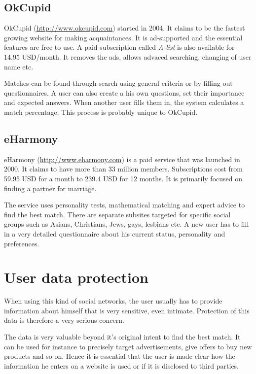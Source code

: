 \documentclass[12pt,oneside]{fithesis}
\begin{document}
		\subsection{OkCupid}
		OkCupid (\url{http://www.okcupid.com}) started in 2004. It claims to be the fastest growing website for making acquaintances.
		It is ad-supported and the essential features are free to use. A paid subscription called \emph{A-list} is also available for 14.95 USD/month. It removes the ads, allows advaced searching, changing of user name etc.
		
		Matches can be found through search using general criteria or by filling out questionnaires. A user can also create a his own questions, set their importance and expected answers. When another user fills them in, the system calculates a match percentage. This process is probably unique to OkCupid. \cite{website:okcupid}
		\subsection{eHarmony}
		eHarmony (\url{http://www.eharmony.com}) is a paid service that was launched in 2000. It claims to have more than 33 million members. Subscriptions cost from 59.95 USD for a month  to 239.4 USD for 12 months. It is primarily focused on finding a partner for marriage.
		
		The service uses personality tests, mathematical matching and expert advice to find the best match. There are separate subsites targeted for specific social groups such as Asians, Christians, Jews, gays, lesbians etc. A new user has to fill in a very detailed questionnaire about his current status, personality and preferences.\cite{website:eharmony}
\section{User data protection}
	When using this kind of social networks, the user usually has to provide information about himself that is very sensitive, even intimate. Protection of this data is therefore a very serious concern.
	
	The data is very valuable beyond it's original intent to find the best match. It can be used for instance to precisely target advertisements, give offers to buy new products and so on. Hence it is essential that the user is made clear how the information he enters on a website is used or if it is disclosed to third parties.
	
\end{document}
